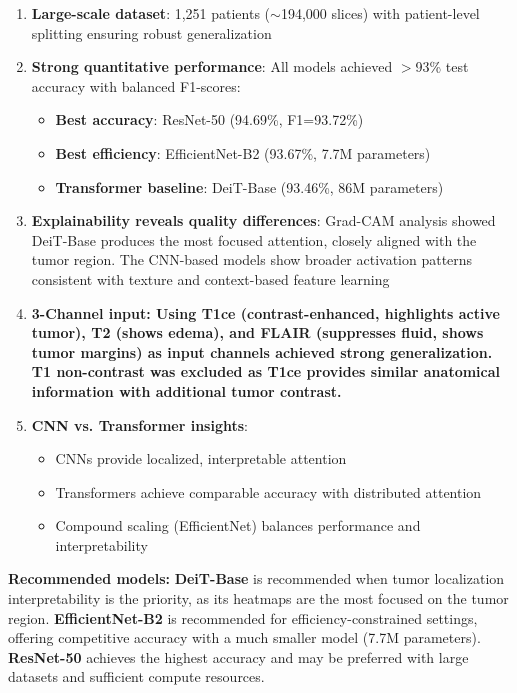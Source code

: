 \begin{enumerate}
    \item \textbf{Large-scale dataset}: 1,251 patients ($\sim$194,000 slices) with patient-level splitting ensuring robust generalization
    
    \item \textbf{Strong quantitative performance}: All models achieved $>$93\% test accuracy with balanced F1-scores:
    \begin{itemize}
        \item \textbf{Best accuracy}: ResNet-50 (94.69\%, F1=93.72\%)
        \item \textbf{Best efficiency}: EfficientNet-B2 (93.67\%, 7.7M parameters)
        \item \textbf{Transformer baseline}: DeiT-Base (93.46\%, 86M parameters)
    \end{itemize}
    
    \item \textbf{Explainability reveals quality differences}: Grad-CAM analysis showed DeiT-Base produces the most focused attention, closely aligned with the tumor region. The CNN-based models show broader activation patterns consistent with texture and context-based feature learning
    
    \item \textbf{3-Channel input: Using T1ce (contrast-enhanced, highlights active tumor), T2 (shows edema), and FLAIR (suppresses fluid, shows tumor margins) as input channels achieved strong generalization. T1 non-contrast was excluded as T1ce provides similar anatomical information with additional tumor contrast.}
    
    \item \textbf{CNN vs. Transformer insights}:
    \begin{itemize}
        \item CNNs provide localized, interpretable attention
        \item Transformers achieve comparable accuracy with distributed attention
        \item Compound scaling (EfficientNet) balances performance and interpretability
    \end{itemize}
\end{enumerate}

\textbf{Recommended models:} \textbf{DeiT-Base} is recommended when tumor localization interpretability is the priority, as its heatmaps are the most focused on the tumor region. \textbf{EfficientNet-B2} is recommended for efficiency-constrained settings, offering competitive accuracy with a much smaller model (7.7M parameters). \textbf{ResNet-50} achieves the highest accuracy and may be preferred with large datasets and sufficient compute resources.
